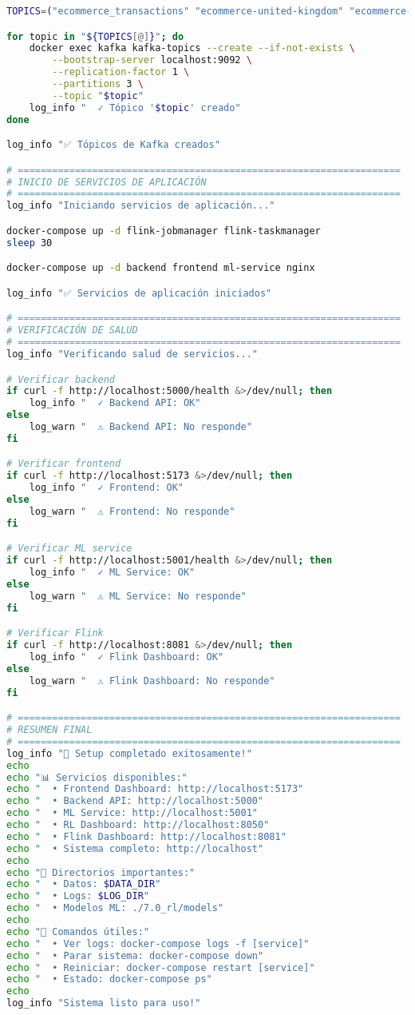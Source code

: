 \begin{lstlisting}[language=bash, caption=Script de Setup Automatizado del Sistema, label=lst:setup_script]
TOPICS=("ecommerce_transactions" "ecommerce-united-kingdom" "ecommerce-germany" "ecommerce-france" "ml-recommendations" "system-events")

for topic in "${TOPICS[@]}"; do
    docker exec kafka kafka-topics --create --if-not-exists \
        --bootstrap-server localhost:9092 \
        --replication-factor 1 \
        --partitions 3 \
        --topic "$topic"
    log_info "  ✓ Tópico '$topic' creado"
done

log_info "✅ Tópicos de Kafka creados"

# ===================================================================
# INICIO DE SERVICIOS DE APLICACIÓN
# ===================================================================
log_info "Iniciando servicios de aplicación..."

docker-compose up -d flink-jobmanager flink-taskmanager
sleep 30

docker-compose up -d backend frontend ml-service nginx

log_info "✅ Servicios de aplicación iniciados"

# ===================================================================
# VERIFICACIÓN DE SALUD
# ===================================================================
log_info "Verificando salud de servicios..."

# Verificar backend
if curl -f http://localhost:5000/health &>/dev/null; then
    log_info "  ✓ Backend API: OK"
else
    log_warn "  ⚠ Backend API: No responde"
fi

# Verificar frontend
if curl -f http://localhost:5173 &>/dev/null; then
    log_info "  ✓ Frontend: OK"
else
    log_warn "  ⚠ Frontend: No responde"
fi

# Verificar ML service
if curl -f http://localhost:5001/health &>/dev/null; then
    log_info "  ✓ ML Service: OK"
else
    log_warn "  ⚠ ML Service: No responde"
fi

# Verificar Flink
if curl -f http://localhost:8081 &>/dev/null; then
    log_info "  ✓ Flink Dashboard: OK"
else
    log_warn "  ⚠ Flink Dashboard: No responde"
fi

# ===================================================================
# RESUMEN FINAL
# ===================================================================
log_info "🎉 Setup completado exitosamente!"
echo
echo "📊 Servicios disponibles:"
echo "  • Frontend Dashboard: http://localhost:5173"
echo "  • Backend API: http://localhost:5000"
echo "  • ML Service: http://localhost:5001"  
echo "  • RL Dashboard: http://localhost:8050"
echo "  • Flink Dashboard: http://localhost:8081"
echo "  • Sistema completo: http://localhost"
echo
echo "📁 Directorios importantes:"
echo "  • Datos: $DATA_DIR"
echo "  • Logs: $LOG_DIR"
echo "  • Modelos ML: ./7.0_rl/models"
echo
echo "🔧 Comandos útiles:"
echo "  • Ver logs: docker-compose logs -f [service]"
echo "  • Parar sistema: docker-compose down"
echo "  • Reiniciar: docker-compose restart [service]"
echo "  • Estado: docker-compose ps"
echo
log_info "Sistema listo para uso!"
\end{lstlisting}

 
